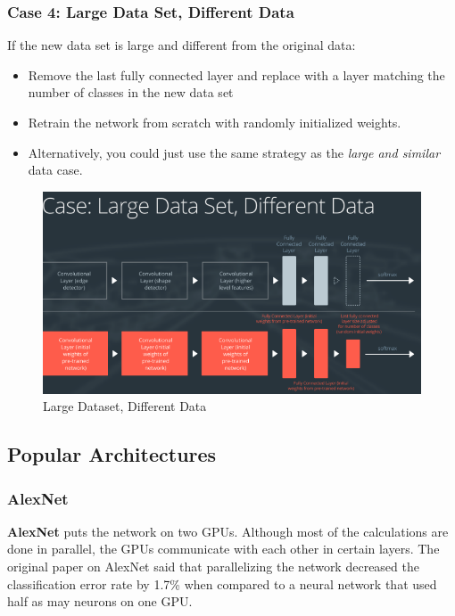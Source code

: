 \documentclass[11pt, a4paper]{article}
\begin{document}
\subsubsection{Case 4: Large Data Set, Different Data}%
\label{ssub:large_data_set_different_data}

If the new data set is large and different from the original data:

\begin{itemize}
	\item Remove the last fully connected layer and replace with a layer matching the number of classes in the new data set
	\item Retrain the network from scratch with randomly initialized weights.
	\item Alternatively, you could just use the same strategy as the \textit{large and similar} data case. 
\end{itemize}




\begin{figure}[htpb!]
	\centering
	\includegraphics[width=0.8\linewidth]{large_dataset_different_data}
	\caption{Large Dataset, Different Data}
	\label{fig:large_dataset_different_data}
\end{figure}





\subsection{Popular Architectures}%
\label{sub:popular_architectures}


\subsubsection{AlexNet}%
\label{ssub:alexnet}

\textbf{AlexNet} puts the network on two GPUs. Although most of the calculations are done in parallel, the GPUs communicate with each other in certain layers. The original paper on AlexNet said that parallelizing the network decreased the classification error rate by 1.7\% when compared to a neural network that used half as may neurons on one GPU.
\end{document}
